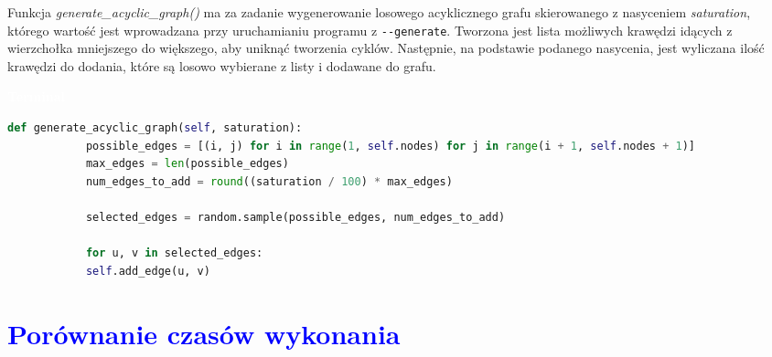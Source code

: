 \documentclass{article}
\begin{document}
	
	\begin{multicols}{2}
	\noindent Funkcja \textit{generate\_acyclic\_graph()} ma za zadanie wygenerowanie losowego acyklicznego grafu skierowanego z nasyceniem \textit{saturation}, którego wartość jest wprowadzana przy uruchamianiu programu z \verb|--generate|. Tworzona jest lista możliwych krawędzi idących z wierzchołka mniejszego do większego, aby uniknąć tworzenia cyklów. Następnie, na podstawie podanego nasycenia, jest wyliczana ilość krawędzi do dodania, które są losowo wybierane z listy i dodawane do grafu.
	
	\begin{tcolorbox}[colback=black,colframe=gray!50!,arc=3mm,boxrule=0pt,left=0pt,right=0pt,width=\linewidth]
		\textcolor{white}{\textbf{\textsf{Terminal}}}\\
	\begin{lstlisting}[language=Python]
		def generate_acyclic_graph(self, saturation):
			possible_edges = [(i, j) for i in range(1, self.nodes) for j in range(i + 1, self.nodes + 1)]
			max_edges = len(possible_edges)
			num_edges_to_add = round((saturation / 100) * max_edges)
			
			selected_edges = random.sample(possible_edges, num_edges_to_add)
			
			for u, v in selected_edges:
			self.add_edge(u, v)
	\end{lstlisting}
	
	\end{tcolorbox}
	\end{multicols}
	
	\section*{\textcolor{blue}{Porównanie czasów wykonania}}
	
\end{document}
